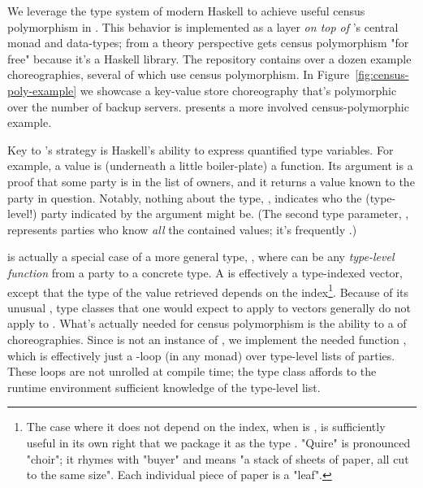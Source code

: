 We leverage the type system of modern Haskell to achieve useful census polymorphism in \MultiChor.
This behavior is implemented as a layer \textit{on top of} \MultiChor's central monad and data-types;
from a theory perspective \MultiChor gets census polymorphism "for free" because it's a Haskell library.
The \MultiChor repository contains over a dozen example choreographies, several of which use census polymorphism.
In Figure~\ref{fig:census-poly-example} we showcase a key-value store choreography that's polymorphic over the number of backup servers.
 presents a more involved census-polymorphic example.

Key to \MultiChor's strategy is Haskell's ability to express quantified type variables.
For example, a  value is (underneath a little boiler-plate) a function.
Its argument is a  proof that some party is in the list of owners,
and it returns a  value known to the party in question.
Notably, nothing about the type, , indicates who the (type-level!) party indicated by the argument might be.
(The second type parameter, , represents parties who know \emph{all} the contained values;
it's frequently .)

 is actually a special case of a more general type,
, where  can be any \emph{type-level function} from a party to a concrete type.
A  is effectively a type-indexed vector,
except that the type of the value retrieved depends on the index\footnote{
    The case where it does not depend on the index, \ie when  is ,
    is sufficiently useful in its own right that we package it as the type .
    "Quire" is pronounced "choir"; it rhymes with "buyer" and means "a stack of sheets of paper, all cut to the same size".
    Each individual piece of paper is a "leaf".
}.
Because of its unusual , type classes that one would expect to apply to vectors generally do not apply to .
What's actually needed for census polymorphism is the ability to  a  of choreographies.
Since  is not an instance of ,
we implement the needed function , which is effectively just a -loop
(in any monad) over type-level lists of parties.
These loops are not unrolled at compile time;
the type class  affords to the runtime environment sufficient knowledge of the type-level list.

